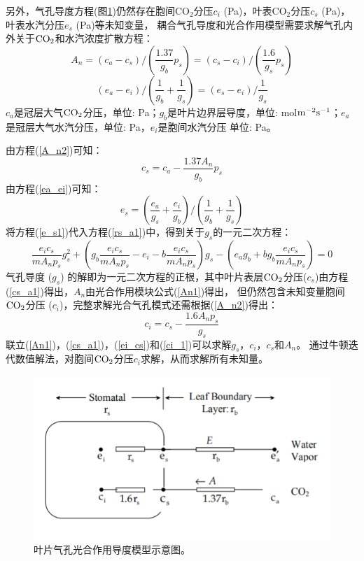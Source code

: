 另外，气孔导度方程(图\ref{fig:叶片气孔光合作用导度模型示意图})仍然存在胞间CO$_2$分压$c_i$ (Pa)，叶表CO$_2$分压$c_s$ (Pa)，叶表水汽分压$e_s$ (Pa)等未知变量，
耦合气孔导度和光合作用模型需要求解气孔内外关于$\rm CO_2$和水汽浓度扩散方程：
\begin{equation}\label{A_n2}
A_{n}=\left(c_{a}-c_{s}\right) /\left(\frac{1.37}{g_{b}} p_{s}\right)=\left(c_{s}-c_{i}\right) /\left(\frac{1.6}{g_{s}} p_{s}\right)
\end{equation}
\begin{equation}\label{ea_ei}
\left(e_{a}-e_{i}\right) /\left(\frac{1}{g_{b}}+\frac{1}{g_{s}}\right)=\left(e_{s}-e_{i}\right) / \frac{1}{g_{s}}
\end{equation}
$c_a$是冠层大气$\rm CO_2$分压，单位: Pa；$g_b$是叶片边界层导度，单位: mol$\rm m^{-2}s^{-1}$；$e_a$是冠层大气水汽分压，单位: Pa，$e_i$是胞间水汽分压 单位: Pa。

由方程(\ref{A_n2})可知：
\begin{equation}\label{cs_a1}
c_{s}=c_{a}-\frac{1.37 A_{n}}{g_{b}} p_{s}
\end{equation}
由方程(\ref{ea_ei})可知：
\begin{equation}\label{e_s1}
e_{s}=\left(\frac{e_{a}}{g_{s}}+\frac{e_{i}}{g_{b}}\right) /\left(\frac{1}{g_{b}}+\frac{1}{g_{s}}\right)
\end{equation}
将方程(\ref{e_s1})代入方程(\ref{rs_a1})中，得到关于$g_s$的一元二次方程：
\begin{equation}\label{ei_cs}
\frac{e_{i} c_{s}}{m A_{n} p_{s}} g_{s}^{2}+\left(g_{b} \frac{e_{i} c_{s}}{m A_{n} p_{s}}-e_{i}-b \frac{e_{i} c_{s}}{m A_{n} p_{s}}\right) g_{s}
-\left(e_{a} g_{b}+b g_{b} \frac{e_{i} c_{s}}{m A_{n} p_{s}}\right)=0
\end{equation}
气孔导度 ($g_s$) 的解即为一元二次方程的正根，其中叶片表层$\rm CO_2$分压($c_s$)由方程(\ref{cs_a1})得出，$A_n$由光合作用模块公式(\ref{An1})得出，
但仍然包含未知变量胞间$\rm CO_2$分压 ($c_i$)，完整求解光合气孔模式还需根据(\ref{A_n2})得出：
\begin{equation}\label{ci_1}
c_{i}=c_{s}-\frac{1.6 A_{n} p_{s}}{g_{s}}
\end{equation}
联立(\ref{An1})，(\ref{cs_a1})，(\ref{ei_cs})和(\ref{ci_1})可以求解$g_s$，$c_i$，$c_s$和$A_n$。
通过牛顿迭代数值解法，对胞间$\rm CO_2$分压$c_i$求解，从而求解所有未知量。

{
\begin{figure}[]
\centering
\includegraphics{Figures/气孔导度和光合作用/叶片气孔光合作用导度模型示意图.png}
\caption{叶片气孔光合作用导度模型示意图。}
\label{fig:叶片气孔光合作用导度模型示意图}
\end{figure}
}
